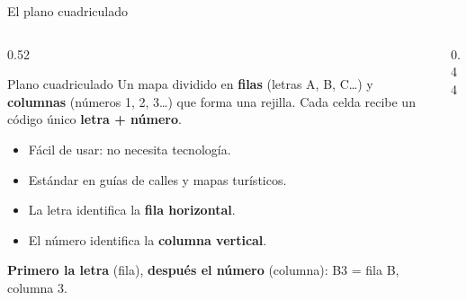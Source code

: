 \documentclass[aspectratio=169, 10pt, spanish]{beamer}
\begin{document}
\begin{frame}{El plano cuadriculado}
  \begin{columns}[c]
    \begin{column}{0.52\textwidth}
      \begin{definicionbox}{Plano cuadriculado}
        Un mapa dividido en \textbf{filas} (letras A, B, C\ldots)
        y \textbf{columnas} (números 1, 2, 3\ldots) que forma una
        rejilla. Cada celda recibe un código único
        \textbf{letra + número}.
      \end{definicionbox}
      \vspace{6pt}
      \begin{itemize}
        \item Fácil de usar: no necesita tecnología.
        \item Estándar en guías de calles y mapas turísticos.
        \item La letra identifica la \textbf{fila horizontal}.
        \item El número identifica la \textbf{columna vertical}.
      \end{itemize}
      \vspace{4pt}
      \begin{notabox}
        \AlmFontSmall
        \textbf{Primero la letra} (fila),
        \textbf{después el número} (columna):
        \quad B3 = fila B, columna 3.
      \end{notabox}
    \end{column}
    \begin{column}{0.44\textwidth}
      \begin{center}
      \end{center}
    \end{column}
  \end{columns}
\end{frame}
\end{document}

